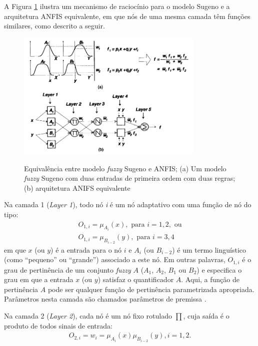 A Figura \ref{fig:anfis} ilustra um mecanismo de raciocínio para o modelo Sugeno e a arquitetura ANFIS equivalente, em que nós de uma mesma camada têm funções similares, como descrito a seguir.
\begin{figure}[!htb]
    \centering
    \caption{Equivalência entre modelo \textit{fuzzy} Sugeno e ANFIS; (a) Um modelo \textit{fuzzy} Sugeno com duas entradas de primeira ordem com duas regras; (b) arquitetura ANIFS equivalente}
    \includegraphics[width=0.8\textwidth]{./04-figuras/fund_teorica/anfis}
    \label{fig:anfis}
\end{figure}

Na camada 1 (\textit{Layer 1}), todo nó \textit{i} é um nó adaptativo com uma função de nó do tipo:
\begin{align*}
    O_{1,i} = \mu_{A_{i}}(x), \mbox{ para } i = 1, 2, \mbox{ ou}\\
    O_{1,i} = \mu_{B_{i-2}}(y), \mbox{ para } i = 3, 4
\end{align*}
em que $x$ (ou $y$) é a entrada para o nó $i$ e $A_{i}$ (ou $B_{i-2}$) é um termo linguístico (como ``pequeno'' ou ``grande'') associado a este nó. Em outras palavras, $O_{1,i}$ é o grau de pertinência de um conjunto \textit{fuzzy} $A$ ($A_1$, $A_2$, $B_1$ ou $B_2$) e especifica o grau em que a entrada $x$ (ou $y$) satisfaz o quantificador $A$. Aqui, a função de pertinência $A$ pode ser qualquer função de pertinência parametrizada apropriada. Parâmetros nesta camada são chamados parâmetros de premissa \cite[p.~336]{Jang1997}.

Na camada 2 (\textit{Layer 2}), cada nó é um nó fixo rotulado $\prod$, cuja saída é o produto de todos sinais de entrada:
\begin{align*}
    O_{2,i} = w_i = \mu_{A_{i}}(x)\mu_{B_{i-2}}(y), i = 1, 2.
\end{align*}

